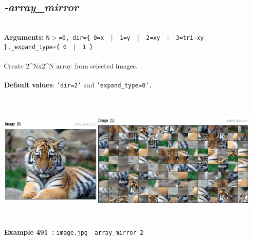 \documentclass[a4paper,11pt,twoside]{book}
\begin{document}
\subsection{\emph{-array\_mirror} }\vspace*{-0.5em}
~\\\textbf{Arguments: } 
{\small \texttt{N$>$=0,\_dir=\{ 0=x ~$|$~ 1=y ~$|$~ 2=xy ~$|$~ 3=tri-xy \},\_expand\_type=\{ 0 ~$|$~ 1 \}}}\\~\\
Create 2\textasciicircum Nx2\textasciicircum N array from selected images.
~\\~\\\textbf{Default values}: {\small \texttt{'dir=2'} and \texttt{'expand\_type=0'.}}
\begin{center}\includegraphics[keepaspectratio=true,height=7cm,width=\textwidth]{img/gmic_def491.jpg}\\
{\footnotesize \textbf{Example 491~:} \texttt{image.jpg -array\_mirror 2}}
\end{center}
\end{document}
